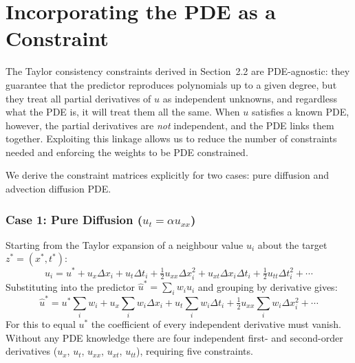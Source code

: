 \documentclass[12pt, a4paper, twoside]{report}
\theoremstyle{plain}
\theoremstyle{definition}
\begin{document}
\section{Incorporating the PDE as a Constraint}
\label{sec:pde_constraint}
The Taylor consistency constraints derived in Section~2.2 are PDE-agnostic: they
guarantee that the predictor reproduces polynomials up to a given degree, but they
treat all partial derivatives of $u$ as independent unknowns, and regardless what the PDE is, it will treat them all the same.
When $u$ satisfies a known PDE, however, the partial derivatives are \emph{not}
independent, and the PDE links them together.
Exploiting this linkage allows us to reduce the number of constraints needed and enforcing the weights to be PDE constrained.

We derive the constraint matrices explicitly for two cases: pure diffusion and
advection diffusion PDE.

\subsubsection*{Case 1: Pure Diffusion \texorpdfstring{($u_t = \alpha u_{xx}$)}{}}

Starting from the Taylor expansion of a neighbour value $u_i$ about the target
$z^* = (x^*, t^*)$:
\begin{equation}
    u_i = u^* + u_x \Delta x_i + u_t \Delta t_i
          + \tfrac{1}{2} u_{xx} \Delta x_i^2 + u_{xt} \Delta x_i \Delta t_i
          + \tfrac{1}{2} u_{tt} \Delta t_i^2 + \cdots
\end{equation}
Substituting into the predictor $\hat{u}^* = \sum_i w_i u_i$ and grouping
by derivative gives:
\begin{equation}
    \hat{u}^* = u^* \sum_i w_i
    + u_x    \sum_i w_i \Delta x_i
    + u_t    \sum_i w_i \Delta t_i
    + \tfrac{1}{2} u_{xx} \sum_i w_i \Delta x_i^2
    + \cdots
\end{equation}
For this to equal $u^*$ the coefficient of every independent derivative must
vanish.
Without any PDE knowledge there are four independent first- and second-order
derivatives ($u_x$, $u_t$, $u_{xx}$, $u_{xt}$, $u_{tt}$), requiring five constraints.
\end{document}
